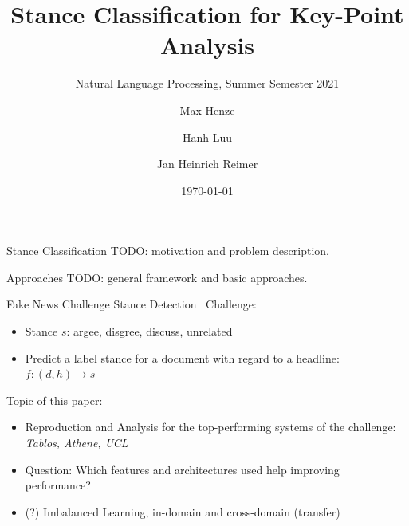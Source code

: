 \documentclass[english,handout]{mlutalk}
\title{Stance Classification for Key-Point Analysis}
\subtitle{Natural Language Processing, Summer Semester 2021}
\author{Max Henze \and Hanh Luu \and Jan Heinrich Reimer}
\institute{Martin Luther University Halle-Wittenberg}
\date{\today}
\begin{document}
\titleframe

\begin{frame}{Stance Classification}
  TODO: motivation and problem description.
\end{frame}

\begin{frame}{Approaches}
  TODO: general framework and basic approaches.
\end{frame}

\begin{frame}{Fake News Challenge Stance Detection~\cite{HanselowskiSSCC2018}}
   Challenge:
  \begin{itemize}
      \item Stance $s$: argee, disgree, discuss, unrelated
      \item Predict a label stance for a document with regard to a headline: $f: (d,h) \rightarrow s$
  \end{itemize}
  Topic of this paper:
  \begin{itemize}
    \item Reproduction and Analysis for the top-performing systems of the challenge: \textit{Tablos, Athene, UCL}
    \item Question: Which features and architectures used help improving performance?
    \item (?) Imbalanced Learning, in-domain and cross-domain (transfer)
  \end{itemize}
\end{frame}
\end{document}
